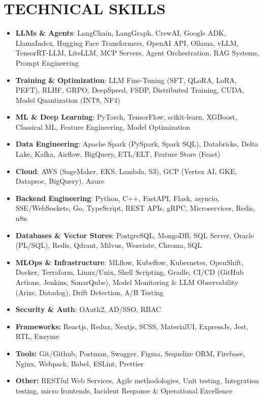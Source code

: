 \documentclass[a4paper]{article}
\begin{document}
\section*{TECHNICAL SKILLS}
\setlength{\arrayrulewidth}{1.2pt}
\begin{itemize}
\item \textbf{LLMs \& Agents}{: LangChain, LangGraph, CrewAI, Google ADK, LlamaIndex, Hugging Face Transformers, OpenAI API, Ollama, vLLM, TensorRT-LLM, LiteLLM, MCP Servers, Agent Orchestration, RAG Systems, Prompt Engineering}
\item \textbf{Training \& Optimization}{: LLM Fine-Tuning (SFT, QLoRA, LoRA, PEFT), RLHF, GRPO, DeepSpeed, FSDP, Distributed Training, CUDA, Model Quantization (INT8, NF4)}
\item \textbf{ML \& Deep Learning}{: PyTorch, TensorFlow, scikit-learn, XGBoost, Classical ML, Feature Engineering, Model Optimization}
\item \textbf{Data Engineering}{: Apache Spark (PySpark, Spark SQL), Databricks, Delta Lake, Kafka, Airflow, BigQuery, ETL/ELT, Feature Store (Feast)}
\item \textbf{Cloud}{: AWS (SageMaker, EKS, Lambda, S3), GCP (Vertex AI, GKE, Dataproc, BigQuery), Azure}
\item \textbf{Backend Engineering}{: Python, C++, FastAPI, Flask, asyncio, SSE/WebSockets, Go, TypeScript, REST APIs, gRPC, Microservices, Redis, n8n}
\item \textbf{Databases \& Vector Stores}{: PostgreSQL, MongoDB, SQL Server, Oracle (PL/SQL), Redis, Qdrant, Milvus, Weaviate, Chroma, SQL}
\item \textbf{MLOps \& Infrastructure}{: MLflow, Kubeflow, Kubernetes, OpenShift, Docker, Terraform, Linux/Unix, Shell Scripting, Gradle, CI/CD (GitHub Actions, Jenkins, SonarQube), Model Monitoring \& LLM Observability (Arize, Datadog), Drift Detection, A/B Testing}
\item \textbf{Security \& Auth}{: OAuth2, AD/SSO, RBAC}
\item \textbf{Frameworks:} Reactjs, Redux, Nextjs, SCSS, MaterialUI, ExpressJs, Jest, RTL, Enzyme
\item \textbf{Tools:} Git/Github, Postman, Swagger, Figma, Sequelize ORM, Firebase, Nginx, Webpack, Babel, ESLint, Prettier
\item \textbf{Other:} RESTful Web Services, Agile methodologies, Unit testing, Integration testing, micro frontends, Incident Response \& Operational Excellence
\end{itemize}
\end{document}
